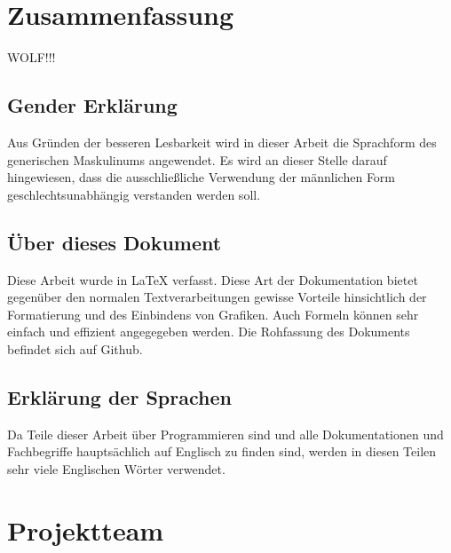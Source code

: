 \section*{Zusammenfassung}
WOLF!!!

\clearpage

\newpage
\thispagestyle{empty}
\mbox{}

\clearpage

\subsection*{Gender Erklärung}
\label{sec:gender-erklaerung}
Aus Gründen der besseren Lesbarkeit wird in dieser Arbeit die Sprachform des generischen Maskulinums angewendet. Es wird an dieser Stelle darauf hingewiesen, dass die ausschließliche Verwendung der männlichen Form geschlechtsunabhängig verstanden werden soll.

\subsection*{Über dieses Dokument}
\label{sec:ueber-dokument}
Diese Arbeit wurde in \LaTeX{} verfasst. Diese Art der Dokumentation bietet gegenüber den normalen Textverarbeitungen gewisse Vorteile hinsichtlich der Formatierung und des Einbindens von Grafiken. Auch Formeln können sehr einfach und effizient angegegeben werden. Die Rohfassung des Dokuments befindet sich auf Github.

\subsection*{Erklärung der Sprachen}
\label{sec:sprachen-erklaerung}
Da Teile dieser Arbeit über Programmieren sind und alle Dokumentationen und Fachbegriffe hauptsächlich auf Englisch zu finden sind, werden in diesen Teilen sehr viele Englischen Wörter verwendet.

\clearpage

\newpage
\thispagestyle{empty}
\mbox{}

\clearpage

\section*{Projektteam}
\label{sec:projektteam}

